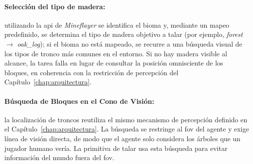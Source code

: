 \begin{table}[htbp]
  \centering
  \caption[Primitivas del agente simbólico para la tarea de woodcutting]{Primitivas del agente simbólico para la tarea de \textit{woodcutting}.}
  \label{tab:htn-primitivas}
\end{table}

\paragraph{Selección del tipo de madera:}
utilizando la \acrshort{api} de \textit{Mineflayer}
se identifica el \gls{bioma} y, mediante un mapeo predefinido, se determina el tipo de madera objetivo a talar
(por ejemplo, \textit{forest} $\rightarrow$ \textit{oak\_log}); si el bioma no está mapeado, se recurre a una
búsqueda visual de los tipos de tronco más comunes en el entorno. Si no hay
madera visible al alcance, la tarea falla en lugar de consultar la posición
omnisciente de los bloques, en coherencia con la restricción de percepción del
Capítulo~\ref{chap:arquitectura}. 

\paragraph{Búsqueda de Bloques en el Cono de Visión:}
la localización de troncos reutiliza el mismo mecanismo de percepción definido en
el Capítulo~\ref{chap:arquitectura}. La búsqueda se restringe al 
\gls{fov} del agente y exige línea de visión directa, de modo que el agente solo
considera los árboles que un jugador humano vería. La primitiva de
talar usa esta búsqueda para evitar información del mundo fuera del \gls{fov}.

